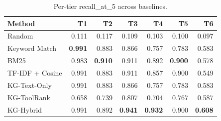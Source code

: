 \begin{table}[t]
\centering
\caption{Per-tier recall\_at\_5 across baselines.}
\label{tab:baselines-per-tier}
\begin{tabular}{lrrrrrr}
\toprule
Method & T1 & T2 & T3 & T4 & T5 & T6 \\
\midrule
Random & 0.111 & 0.117 & 0.109 & 0.103 & 0.100 & 0.097 \\
Keyword Match & \textbf{0.991} & 0.883 & 0.866 & 0.757 & 0.783 & 0.583 \\
BM25 & 0.983 & \textbf{0.910} & 0.911 & 0.892 & \textbf{0.900} & 0.578 \\
TF-IDF + Cosine & 0.991 & 0.883 & 0.911 & 0.857 & 0.900 & 0.549 \\
KG-Text-Only & 0.991 & 0.883 & 0.866 & 0.757 & 0.783 & 0.583 \\
KG-ToolRank & 0.658 & 0.739 & 0.807 & 0.704 & 0.767 & 0.587 \\
KG-Hybrid & 0.991 & 0.892 & \textbf{0.941} & \textbf{0.932} & 0.900 & \textbf{0.608} \\
\bottomrule
\end{tabular}
\end{table}